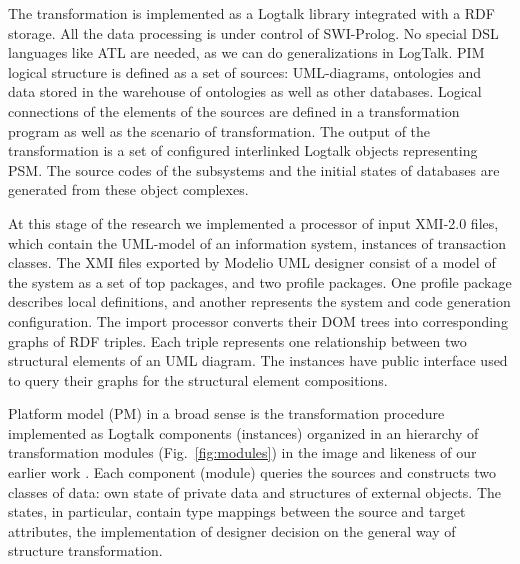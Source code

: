 \documentclass[runningheads]{llncs}
\begin{document}
The transformation is implemented as a Logtalk library integrated with a RDF storage.  All the data processing is under control of SWI-Prolog.  No special DSL languages like ATL are needed, as we can do generalizations in LogTalk.  PIM logical structure is defined as a set of sources: UML-diagrams, ontologies and data stored in the warehouse of ontologies as well as other databases.  Logical connections of the elements of the sources are defined in a transformation program as well as the scenario of transformation.  The output of the transformation is a set of configured interlinked Logtalk objects representing PSM.  The source codes of the subsystems and the initial states of databases are generated from these object complexes.

At this stage of the research we implemented a processor of input XMI-2.0 files, which contain the UML-model of an information system, instances of transaction classes.  The XMI files exported by Modelio UML designer consist of a model of the system as a set of top packages, and two profile packages.  One profile package describes local definitions, and another represents the system and code generation configuration.  The import processor converts their DOM trees into corresponding graphs of RDF triples.  Each triple represents one relationship between two structural elements of an UML diagram.  The instances have public interface used to query their graphs for the structural element compositions.

Platform model (PM) in a broad sense is the transformation procedure implemented as Logtalk components (instances) organized in an hierarchy of transformation modules (Fig.~\ref{fig:modules}) in the image and likeness of our earlier work \cite{tereh1}.  Each component (module) queries the sources and constructs two classes of data: own state of private data and structures of external objects.  The states, in particular, contain type mappings between the source and target attributes, the implementation of designer decision on the general way of structure transformation.  %
\end{document}
